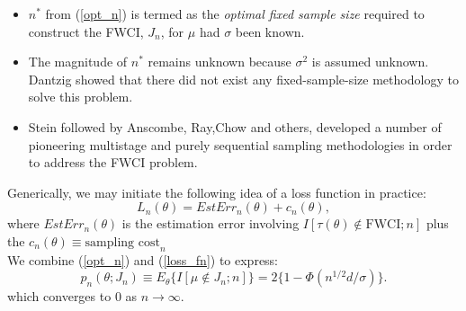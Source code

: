 \documentclass [xcolor=svgnames, t] {beamer}
\begin{document}
 \begin{frame}{}
  \vspace{7mm}

\begin{itemize}
\item $n^*$ from (\ref{opt_n}) is termed as the \textit{optimal fixed sample size} required to 
construct the FWCI, $J_n$, for $\mu$ had $\sigma$ been known.
\item The magnitude of $n^*$ remains unknown because $\sigma^2$ is 
assumed unknown. Dantzig\cite{dantzig1940} showed that there 
did not exist any fixed-sample-size methodology to solve this problem.
\item Stein\cite{stein1945}\cite{stein1949} followed by Anscombe\cite{anscombe1952}\cite{anscombe1953}, Ray\cite{ray1957},Chow\cite{chow1965} and
others, developed a number of pioneering multistage and purely sequential sampling
methodologies in order to address the FWCI problem.
\end{itemize}



\end{frame}
\begin{frame}{}
    \vspace{7mm}
    Generically, we may initiate the following idea of a loss function in practice:
        \begin{equation} \label{loss_fn}
            L_n(\theta)  = EstErr_n(\theta)+c_n(\theta),
        \end{equation}
        where $EstErr_n(\theta)$ is the estimation error involving 
        $I \left[ {\tau(\theta) \not\in \text{FWCI};n} \right]$ plus the $c_n(\theta) \equiv \text{sampling cost}_n$\\
        \vspace{2mm}
    We combine (\ref{opt_n}) and (\ref{loss_fn}) to express:
        \begin{equation} \label{p_n_theta}
        p_n(\theta ;J_n) \equiv E_{\theta} \{ {I[ \mu \not\in J_n;n]}\} =2\{ 1-\Phi(n^{1/2}d/\sigma) \}.
        \end{equation}
        which converges to $0$ as $n \rightarrow \infty$.\\
        \vspace{0.1cm}
                
\end{frame}
\end{document}
